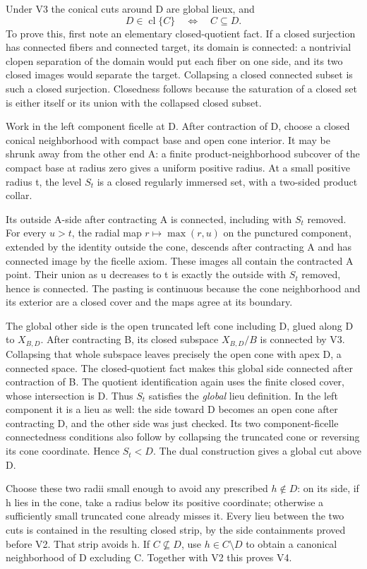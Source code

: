 Under V3 the conical cuts around D are global lieux, and
\[
 D\in\operatorname{cl}\{C\}\quad\Longleftrightarrow\quad C\subseteq D. \tag{V4}
\]
To prove this, first note an elementary closed-quotient fact. If a closed surjection has connected fibers and connected target, its domain is connected: a nontrivial clopen separation of the domain would put each fiber on one side, and its two closed images would separate the target. Collapsing a closed connected subset is such a closed surjection. Closedness follows because the saturation of a closed set is either itself or its union with the collapsed closed subset.

Work in the left component ficelle at D. After contraction of D, choose a closed conical neighborhood with compact base and open cone interior. It may be shrunk away from the other end A: a finite product-neighborhood subcover of the compact base at radius zero gives a uniform positive radius. At a small positive radius t, the level $S_t$ is a closed regularly immersed set, with a two-sided product collar.

Its outside A-side after contracting A is connected, including with $S_t$ removed. For every $u>t$, the radial map $r\mapsto\max(r,u)$ on the punctured component, extended by the identity outside the cone, descends after contracting A and has connected image by the ficelle axiom. These images all contain the contracted A point. Their union as u decreases to t is exactly the outside with $S_t$ removed, hence is connected. The pasting is continuous because the cone neighborhood and its exterior are a closed cover and the maps agree at its boundary.

The global other side is the open truncated left cone including D, glued along D to $X_{B,D}$. After contracting B, its closed subspace $X_{B,D}/B$ is connected by V3. Collapsing that whole subspace leaves precisely the open cone with apex D, a connected space. The closed-quotient fact makes this global side connected after contraction of B. The quotient identification again uses the finite closed cover, whose intersection is D. Thus $S_t$ satisfies the \emph{global} lieu definition. In the left component it is a lieu as well: the side toward D becomes an open cone after contracting D, and the other side was just checked. Its two component-ficelle connectedness conditions also follow by collapsing the truncated cone or reversing its cone coordinate. Hence $S_t<D$. The dual construction gives a global cut above D.

Choose these two radii small enough to avoid any prescribed $h\notin D$: on its side, if h lies in the cone, take a radius below its positive coordinate; otherwise a sufficiently small truncated cone already misses it. Every lieu between the two cuts is contained in the resulting closed strip, by the side containments proved before V2. That strip avoids h. If $C\not\subseteq D$, use $h\in C\setminus D$ to obtain a canonical neighborhood of D excluding C. Together with V2 this proves V4.

